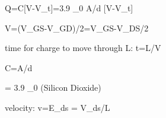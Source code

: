 Q=C[V-V_t]=3.9 \epsilon_0 A/d [V-V_t]

V=(V_{GS}-V_{GD})/2=V_{GS}-V_{DS}/2

time for charge to move through L: t=L/V


C=\epsilon A/d

\epsilon = 3.9 \epsilon_0 (Silicon Dioxide)

velocity:
v=\mu E_{ds} = \mu V_{ds}/L


